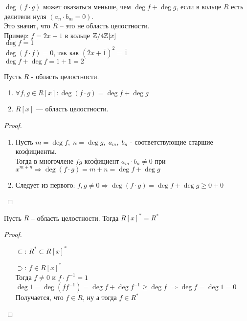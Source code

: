 \begin{normalsize}
\notice
$\deg(f\cdot g)$ может оказаться меньше, чем $\deg f + \deg g$, если в кольце $R$ есть делители нуля $(a_n\cdot b_m = 0)$. \\
Это значит, что $R$ -- это не область целостности. \\
Пример: $f = \bar{2}x + \bar{1}$ в кольце $\mathbb{Z} / 4\mathbb{Z}[x]$ \\
$\deg f = 1$ \\
$\deg(f\cdot f) = 0$, так как $(\bar{2}x + \bar{1})^2=\bar{1}$ \\
$\deg f + \deg f= 1 + 1 = 2$ \\

\begin{theorem-non}
    Пусть $R$ - область целостности.
    \begin{enumerate}
        \item $\forall f,g \in R[x]: \deg(f\cdot g) = \deg f + \deg g$
        \item $R[x]$ --- область целостности.
    \end{enumerate}
\end{theorem-non}

\begin{proof}
    $ $
    \begin{enumerate}
        \item Пусть $m = \deg f,\; n = \deg g,\; a_m,\; b_n$ - соответствующие старшие коэфициенты. \\
        Тогда в многочлене $fg$ коэфициент $a_m\cdot b_n \neq 0$ при $x^{m+n} \Rightarrow \deg(f\cdot g) = m + n = \deg f + \deg g$    
        \item Следует из первого: $f,g \neq 0 \Rightarrow \deg(f\cdot g) = \deg f + \deg g \geqslant 0 + 0$
    \end{enumerate}
\end{proof}
\follow \; Пусть $R$ -- область целостности. Тогда $R[x]^* = R^*$
\begin{proof}
    $ $
    \begin{itemize}
        \item[$\subset$:] $R^* \subset R[x]^*$
        \item[$\supset$:] $f \in R[x]^*$ \\
        Тогда $f \neq 0$ и $f\cdot f^{-1} = 1$ \\
        $\deg 1 = \deg(ff^{-1}) = \deg f + \deg f^{-1} \geqslant \deg f$ $\Rightarrow \deg f = \deg 1 = 0$ \\
        Получается, что $f \in R$, ну а тогда $f \in R^*$ \\


\end{itemize}
\end{proof}
\end{normalsize}
